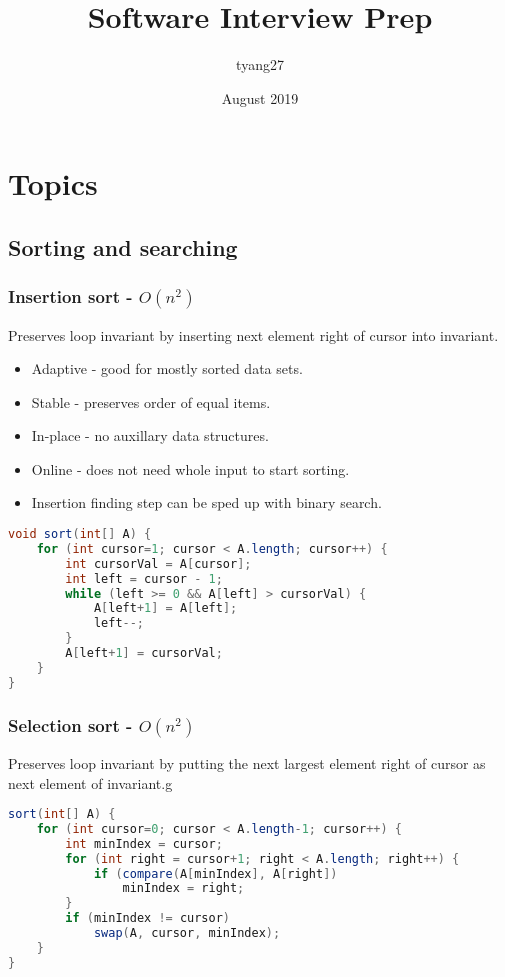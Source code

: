 \documentclass[10pt]{article}
\title{Software Interview Prep}
\author{tyang27}
\date{August 2019}
\begin{document}

\section{Topics}
\subsection{Sorting and searching}
\subsubsection{Insertion sort - $O(n^2)$}
Preserves loop invariant by inserting next element right of cursor into invariant.
\begin{itemize}
    \itemsep0em 
    \item Adaptive - good for mostly sorted data sets.
    \item Stable - preserves order of equal items.
    \item In-place - no auxillary data structures.
    \item Online - does not need whole input to start sorting.
    \item Insertion finding step can be sped up with binary search.
\end{itemize}
\begin{lstlisting}[language=java]
void sort(int[] A) {
    for (int cursor=1; cursor < A.length; cursor++) {
        int cursorVal = A[cursor];
        int left = cursor - 1;
        while (left >= 0 && A[left] > cursorVal) {
            A[left+1] = A[left];
            left--;
        }
        A[left+1] = cursorVal;
    }
}
\end{lstlisting}

\subsubsection{Selection sort - $O(n^2)$}
Preserves loop invariant by putting the next largest element right of cursor as next element of invariant.g
\begin{lstlisting}[language=java]
sort(int[] A) {
    for (int cursor=0; cursor < A.length-1; cursor++) {
        int minIndex = cursor;
        for (int right = cursor+1; right < A.length; right++) {
            if (compare(A[minIndex], A[right])
                minIndex = right;
        }
        if (minIndex != cursor)
            swap(A, cursor, minIndex);
    }
}
\end{lstlisting}
\end{document}
